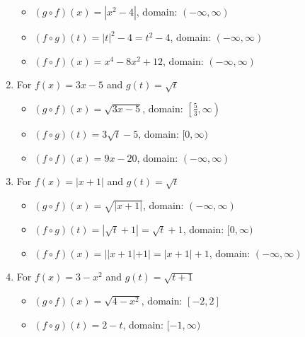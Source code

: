 \documentclass{ximera}
\begin{document}
\begin{enumerate}
\begin{itemize}

\item  $(g \circ f)(x) = |x^2-4|$, domain: $(-\infty, \infty)$

\item  $(f \circ g)(t) =|t|^2-4 = t^2-4$, domain: $(-\infty, \infty)$

\item  $(f \circ f)(x) =x^4-8x^2+12$, domain: $(-\infty, \infty)$

\end{itemize}

\item For   $f(x) = 3x-5$ and $g(t) = \sqrt{t}$ 

\begin{itemize}

\item  $(g \circ f)(x) = \sqrt{3x-5}$, domain: $\left[ \frac{5}{3}, \infty \right)$

\item  $(f \circ g)(t) = 3\sqrt{t}-5$, domain: $[0,\infty)$

\item  $(f \circ f)(x) = 9x-20$, domain: $(-\infty, \infty)$

\end{itemize}


\item For   $f(x) = |x+1|$ and $g(t) = \sqrt{t}$

\begin{itemize}

\item  $(g \circ f)(x) = \sqrt{|x+1|}$, domain: $(-\infty, \infty)$

\item  $(f \circ g)(t) = |\sqrt{t}+1| = \sqrt{t}+1$, domain: $[0,\infty)$

\item  $(f \circ f)(x) = ||x+1|+1| = |x+1|+1$, domain: $(-\infty, \infty)$

\end{itemize}


\item For   $f(x) = 3-x^2$ and $g(t) = \sqrt{t+1}$ 

\begin{itemize}

\item  $(g \circ f)(x) = \sqrt{4-x^2}$, domain: $[-2,2]$

\item  $(f \circ g)(t) =2-t$, domain: $[-1, \infty)$


\end{itemize}
\end{enumerate}
\end{document}
